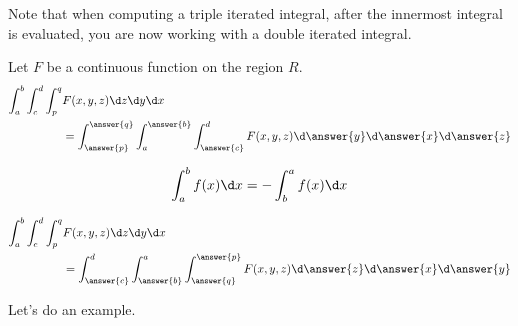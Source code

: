 \documentclass{ximera}
\begin{document}
\begin{remark}
  Note that when computing a triple iterated integral, after the
  innermost integral is evaluated, you are now working with a double
  iterated integral.
\end{remark}






\begin{question}
  Let $F$ be a continuous function on the region $R$.
  \begin{align*}
    \int_a^b\int_c^d\int_p^q &F(x,y,z)\d z \d y\d x \\
    &= \int_{\answer{p}}^{\answer{q}}\int_a^{\answer{b}}
    \int_{\answer{c}}^d F(x,y,z)\d \answer{y} \d \answer{x} \d \answer{z}
  \end{align*}
  \begin{question}
    \begin{hint}
      \[
      \int_a^b f(x) \d x = - \int_b^a f(x) \d x
      \]
    \end{hint}
    \begin{align*}
      \int_a^b\int_c^d\int_p^q &F(x,y,z)\d z \d y\d x \\
      &= \int_{\answer{c}}^{d}
    \int_{\answer{b}}^{a}\int_{\answer{q}}^{\answer{p}}
    F(x,y,z)\d \answer{z} \d \answer{x} \d \answer{y}
    \end{align*}
  \end{question}
\end{question}

Let's do an example.
\end{document}
